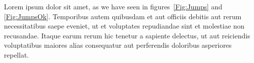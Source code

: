 ﻿\documentclass[11pt]{article}
\begin{document}
Lorem ipsum dolor sit amet, as we have seen in figures~\ref{Fig:Jumps} and \ref{Fig:JumpsOk}. Temporibus autem quibusdam et aut officiis debitis aut rerum necessitatibus saepe eveniet, ut et voluptates repudiandae sint et molestiae non recusandae. Itaque earum rerum hic tenetur a sapiente delectus, ut aut reiciendis voluptatibus maiores alias consequatur aut perferendis doloribus asperiores repellat.


%
%
\end{document}
